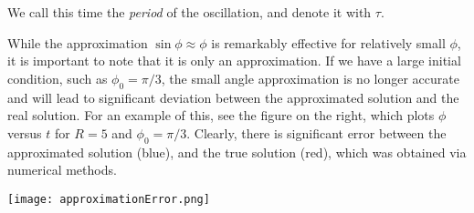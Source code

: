 \begin{example}
    We call this time the \textit{period} of the oscillation, and denote it with $\tau$.

    \begin{minipage}{0.48\textwidth}
    While the approximation $\sin\phi\approx\phi$ is remarkably effective for relatively small $\phi$, it is important to note that it is only an approximation. If we have a large initial condition, such as $\phi_0 = \pi/3$, the small angle approximation is no longer accurate and will lead to significant deviation between the approximated solution and the real solution. For an example of this, see the figure on the right, which plots $\phi$ versus $t$ for $R=5$ and $\phi_0 = \pi/3$. Clearly, there is significant error between the approximated solution (blue), and the true solution (red), which was obtained via numerical methods.
    \end{minipage}
    \begin{minipage}{0.48\textwidth}
        \parbox{\textwidth}{
            \label{error}
            \texttt{[image: approximationError.png]}
        }
    \end{minipage}
\end{example}
